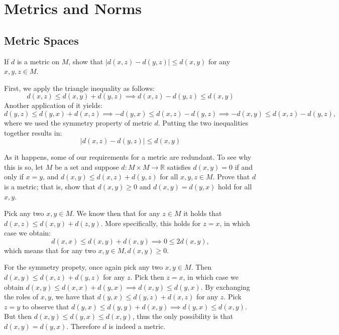 \chapter{Metrics and Norms}

\section{Metric Spaces}


\begin{exercise}{2}
    If $d$ is a metric on $M$, show that $\lvert d(x, z) - d(y, z) \rvert \leq d(x, y) $ for any $x, y, z \in M$.
\end{exercise}

\begin{solution}
    
    First, we apply the triangle inequality as follows:
    $$d(x, z) \leq d(x, y) + d(y ,z) \implies d(x, z) - d(y, z) \leq d(x, y)$$
    Another application of it yields:
    $$d(y, z) \leq d(y, x) + d(x, z) \implies -d(y, x) \leq d(x, z) - d(y, z) \implies -d(x, y) \leq d(x, z) - d(y,z),$$
    where we used the symmetry property of metric $d$.
    Putting the two inequalities together results in:
    $$\lvert d(x, z) - d(y, z) \rvert \leq d(x, y)$$
\end{solution}

\begin{exercise}{3}
    As it happens, some of our requirements for a metric are redundant.
    To see why this is so, let $M$ be a set and suppose $d: M \times M \rightarrow \mathbb{R}$ satisfies $d(x, y) = 0$ if and only if $x = y$, and $d(x, y) \leq d(x, z) + d(y, z)$ for all $x, y, z \in M$.
    Prove that $d$ is a metric; that is, show that $d(x, y) \geq 0$ and $d(x, y) = d(y, x)$ hold for all $x, y$.
\end{exercise}

\begin{solution}
    
    Pick any two $x, y \in M$.
    We know then that for any $z \in M$ it holds that $d(x, z) \leq d(x, y) + d(z, y)$.
    More specifically, this holds for $z = x$, in which case we obtain:
    $$d(x, x) \leq d(x, y) + d(x, y) \implies 0 \leq 2d(x, y),$$
    which means that for any two $x, y \in M, d(x, y) \geq 0$.

    For the symmetry propety, once again pick any two $x, y \in M$.
    Then $d(x, y) \leq d(x, z) + d(y, z)$ for any $z$.
    Pick then $z = x$, in which case we obtain $d(x, y) \leq d(x, x) + d(y, x) \implies d(x, y) \leq d(y, x)$.
    By exchanging the roles of $x, y$, we have that $d(y, x) \leq d(y, z) + d(x, z)$ for any $z$.
    Pick $z = y$ to observe that $d(y, x) \leq d(y, y) + d(x, y) \implies d(y, x) \leq d(x, y)$.
    But then $d(x, y) \leq d(y, x) \leq d(x, y)$, thus the only possibility is that $d(x, y) = d(y, x)$.
    Therefore $d$ is indeed a metric.
\end{solution}

